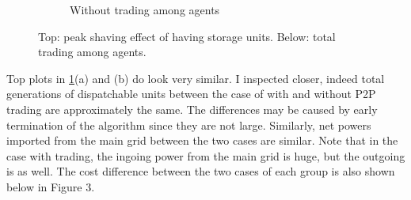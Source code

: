 \documentclass[10pt]{article}
\newtheorem{definitiox	n}{Definition}{\it}{}
\newcommand{\0}{\mathbf{0}}
\newcommand{\1}{\mathbf{1}}
\begin{document}
\begin{figure}[h]
\begin{subfigure}{0.5\textwidth}
        \caption{Without trading among agents}
    \end{subfigure}
    \caption{Top: peak shaving effect of having storage units. Below: total trading among agents.}
    \label{fig:sim_A1}
\end{figure}
Top plots in \ref{fig:sim_A1}(a) and (b) do look very similar. I inspected closer, indeed total generations of dispatchable units between the case of with and without P2P trading are approximately the same. The differences may be caused by early termination of the algorithm since they are not large. Similarly, net powers imported from the main grid between the two cases are similar.  Note that in the case with trading, the ingoing power from the main grid is huge, but the outgoing is as well. The cost difference between the two cases of each group is also shown below in Figure 3. 
\end{document}
